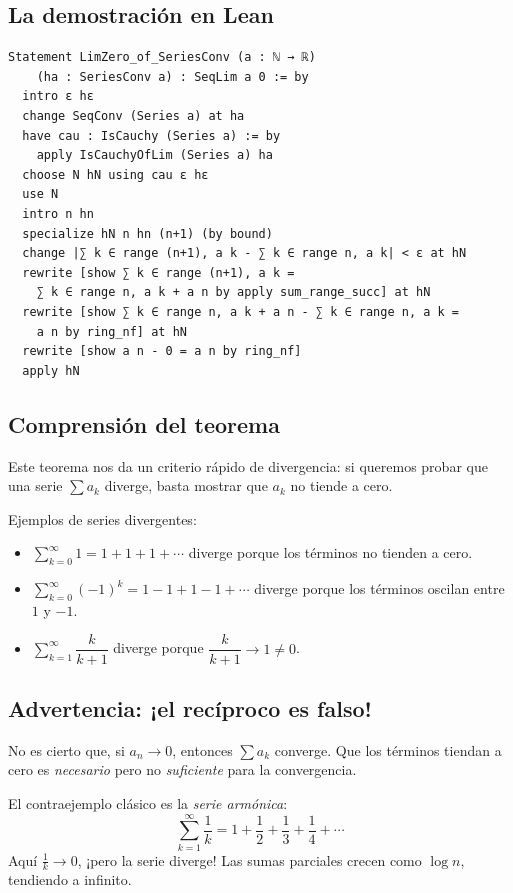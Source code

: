 \subsection{La demostración en Lean}

\begin{verbatim}
Statement LimZero_of_SeriesConv (a : ℕ → ℝ)
    (ha : SeriesConv a) : SeqLim a 0 := by
  intro ε hε
  change SeqConv (Series a) at ha
  have cau : IsCauchy (Series a) := by
    apply IsCauchyOfLim (Series a) ha
  choose N hN using cau ε hε
  use N
  intro n hn
  specialize hN n hn (n+1) (by bound)
  change |∑ k ∈ range (n+1), a k - ∑ k ∈ range n, a k| < ε at hN
  rewrite [show ∑ k ∈ range (n+1), a k =
    ∑ k ∈ range n, a k + a n by apply sum_range_succ] at hN
  rewrite [show ∑ k ∈ range n, a k + a n - ∑ k ∈ range n, a k =
    a n by ring_nf] at hN
  rewrite [show a n - 0 = a n by ring_nf]
  apply hN
\end{verbatim}

\subsection{Comprensión del teorema}

Este teorema nos da un criterio rápido de divergencia: si queremos probar que una serie $\sum a_k$ diverge, basta mostrar que $a_k$ no tiende a cero.

Ejemplos de series divergentes:
\begin{itemize}
  \item $\sum_{k=0}^{\infty} 1 = 1+1+1+\cdots$ diverge porque los términos no tienden a cero.
  \item $\sum_{k=0}^{\infty} (-1)^k = 1-1+1-1+\cdots$ diverge porque los términos oscilan entre $1$ y $-1$.
  \item $\sum_{k=1}^{\infty} \dfrac{k}{k+1}$ diverge porque $\dfrac{k}{k+1} \to 1 \neq 0$.
\end{itemize}

\subsection{Advertencia: ¡el recíproco es falso!}

No es cierto que, si $a_n \to 0$, entonces $\sum a_k$ converge. Que los términos tiendan a cero es \emph{necesario} pero no \emph{suficiente} para la convergencia.

El contraejemplo clásico es la \emph{serie armónica}:
\[
  \sum_{k=1}^{\infty} \frac{1}{k} = 1 + \frac12 + \frac13 + \frac14 + \cdots
\]
Aquí $\frac1k \to 0$, ¡pero la serie diverge! Las sumas parciales crecen como $\log n$, tendiendo a infinito.

